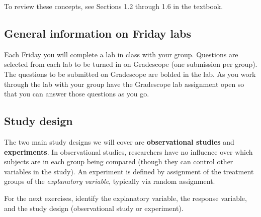 \documentclass[
]{report}
\begin{document}
To review these concepts, see Sections 1.2 through 1.6 in the textbook.

\hypertarget{general-information-on-friday-labs}{%
\subsection{General information on Friday labs}\label{general-information-on-friday-labs}}

Each Friday you will complete a lab in class with your group. Questions are selected from each lab to be turned in on Gradescope (one submission per group). The questions to be submitted on Gradescope are bolded in the lab. As you work through the lab with your group have the Gradescope lab assignment open so that you can answer those questions as you go.

\hypertarget{study-design-1}{%
\subsection{Study design}\label{study-design-1}}

The two main study designs we will cover are \textbf{observational studies} and \textbf{experiments}. In observational studies, researchers have no influence over which subjects are in each group being compared (though they can control other variables in the study). An experiment is defined by assignment of the treatment groups of the \emph{explanatory variable}, typically via random assignment.

For the next exercises, identify the explanatory variable, the response variable, and the study design (observational study or experiment).

\newpage
\end{document}
